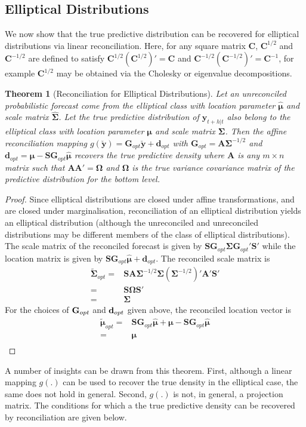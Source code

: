\documentclass[a4paper, 11pt]{article}
\theoremstyle{theo}
\newtheorem{theo}{Theorem}[section]
\theoremstyle{definition}
\begin{document}
\subsection{Elliptical Distributions}
We now show that the true predictive distribution can be recovered for elliptical distributions via linear reconciliation.  Here, for any square matrix ${\bm C}$, ${\bm C}^{1/2}$ and ${\bm C}^{-1/2}$ are defined to satisfy ${\bm C}^{1/2}\left({\bm C}^{1/2}\right)'={\bm C}$ and ${\bm C}^{-1/2}\left({\bm C}^{-1/2}\right)'={\bm C}^{-1}$, for example ${\bm C}^{1/2}$ may be obtained via the Cholesky or eigenvalue decompositions. 
\begin{theo}[Reconciliation for Elliptical Distributions]
	Let an unreconciled probabilistic forecast come from the elliptical class with location parameter $\hat{\bm \mu}$ and scale matrix $\hat{\bm \Sigma}$.  Let the true predictive distribution of ${\bm y}_{t+h|t}$ also belong to the elliptical class with location parameter ${\bm \mu}$ and scale matrix ${\bm \Sigma}$.  Then the affine reconciliation mapping $g(\breve{\bm y})={\bm G}_{opt}\breve{\bm y}+{\bm d}_{opt}$ with $\bm{G}_{opt}={\bm A}{\bm\Sigma}^{-1/2}$ and ${\bm d}_{opt}={\bm \mu}-{\bm S}{\bm G}_{opt}\hat{\bm \mu}$ recovers the true predictive density where ${\bm A}$ is any $m\times n$ matrix such that ${\bm A}{\bm A}'={\bm \Omega}$ and ${\bm \Omega}$ is the true variance covariance matrix of the predictive distribution for the bottom level. 
\end{theo}
\begin{proof}
   Since elliptical distributions are closed under affine transformations, and are closed under marginalisation, reconciliation of an elliptical distribution yields an elliptical distribution (although the unreconciled and unreconciled distributions may be different members of the class of elliptical distributions).  The scale matrix of the reconciled forecast is given by $\bm{S}\bm{G}_{opt}{\bm \Sigma}{\bm G}_{opt}'{\bm S}'$ while the location matrix is given by $\bm{S}\bm{G}_{opt}\hat{\bm \mu}+{\bm d}_{opt}$.  The reconciled scale matrix is 
   \begin{align*}
   \tilde{\bm \Sigma}_{opt}=&{\bm S}{\bm A}{\bm\Sigma}^{-1/2}{\bm \Sigma}\left({\bm\Sigma}^{-1/2}\right)'{\bm A}'{\bm S}'\\
   =&{\bm S}{\bm \Omega}{\bm S}'\\
   =&{\bm \Sigma}
   \end{align*}
   For the choices of ${\bf G}_{opt}$ and ${\bf d}_{opt}$ given above, the reconciled location vector is 
   \begin{align*}
   \tilde{\bm \mu}_{opt}=&{\bm S}{\bm G}_{opt}\hat{\bm \mu}+{\bm \mu}-{\bm S}{\bm G}_{opt}\hat{\bm \mu}\\
   =&{\bm \mu}\\
   \end{align*}
\end{proof}	
A number of insights can be drawn from this theorem.  First, although a linear mapping $g(.)$ can be used to recover the true density in the elliptical case, the same does not hold in general.  Second, $g(.)$ is not, in general, a projection matrix.  The conditions for which a the true predictive density can be recovered by reconciliation are given below.
\end{document}
